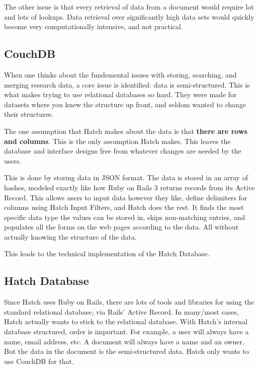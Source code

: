 The other issue is that every retrieval of data from a document would require lot and 
lots of lookups. Data retrieval over significantly high data sets would quickly become
very computationally intensive, and not practical.


\subsection{CouchDB}
When one thinks about the fundemental issues with storing, searching, and merging 
research data, a core issue is identified: data is semi-structured. This is what
makes trying to use relational databases so hard. They were made for datasets where
you knew the structure up front, and seldom wanted to change their structures.

The one assumption that Hatch makes about the data is that \textbf{there are rows and
columns}. This is the only assumption Hatch makes. This leaves the database and 
interface designs free from whatever changes are needed by the users.

This is done by storing data in JSON format. The data is stored in an array of hashes,
modeled exactly like how Ruby on Rails 3 returns records from its Active Record.
This allows users to input data however they like, define delimiters for columns using
Hatch Input Filters, and Hatch does the rest. It finds the most specific data type the
values can be stored in, skips non-matching entries, and populates all the forms on 
the web pages according to the data. All without actually knowing the structure of the 
data.

This leads to the technical implementation of the Hatch Database.


\subsection{Hatch Database}
Since Hatch uses Ruby on Rails, there are lots of tools and libraries for using the 
standard relational database, via Rails' Active Record. In many/most cases, Hatch
actually wants to stick to the relational database. With Hatch's internal database
structured, order is important. For example, a user will always have a name, email
address, etc. A document will always have a name and an owner. But the data in the
document is the semi-structured data. Hatch only wants to use CouchDB for that.

